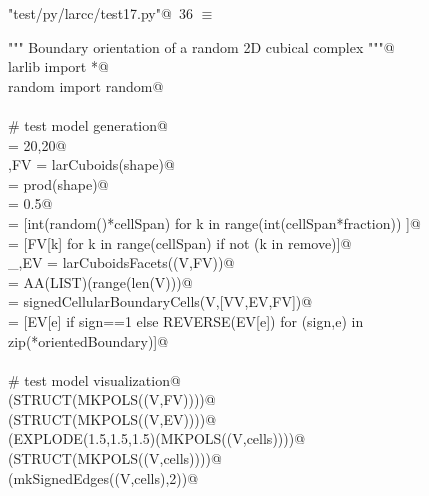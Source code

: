 \documentclass[11pt,oneside]{article}    %
\begin{document}
\begin{flushleft} \small \label{scrap58}
\protect{}\verb@"test/py/larcc/test17.py"@\nobreak\ {\footnotesize 36 }$\equiv$
\vspace{-1ex}
\begin{list}{}{} \item
\mbox{}\verb@""" Boundary orientation of a random 2D cubical complex """@\\
\mbox{}\verb@from larlib import *@\\
\mbox{}\verb@from random import random@\\
\mbox{}\verb@@\\
\mbox{}\verb@# test model generation@\\
\mbox{}\verb@shape = 20,20@\\
\mbox{}\verb@V,FV = larCuboids(shape)@\\
\mbox{}\verb@cellSpan = prod(shape)@\\
\mbox{}\verb@fraction = 0.5@\\
\mbox{}\verb@remove = [int(random()*cellSpan) for k in range(int(cellSpan*fraction)) ]@\\
\mbox{}\verb@FV = [FV[k] for k in range(cellSpan) if not (k in remove)]@\\
\mbox{}\verb@_,EV = larCuboidsFacets((V,FV))@\\
\mbox{}\verb@VV = AA(LIST)(range(len(V)))@\\
\mbox{}\verb@orientedBoundary = signedCellularBoundaryCells(V,[VV,EV,FV])@\\
\mbox{}\verb@cells = [EV[e] if sign==1 else REVERSE(EV[e]) for (sign,e) in zip(*orientedBoundary)]@\\
\mbox{}\verb@@\\
\mbox{}\verb@# test model visualization@\\
\mbox{}\verb@VIEW(STRUCT(MKPOLS((V,FV))))@\\
\mbox{}\verb@VIEW(STRUCT(MKPOLS((V,EV))))@\\
\mbox{}\verb@VIEW(EXPLODE(1.5,1.5,1.5)(MKPOLS((V,cells))))@\\
\mbox{}\verb@VIEW(STRUCT(MKPOLS((V,cells))))@\\
\mbox{}\verb@VIEW(mkSignedEdges((V,cells),2))@\\
\mbox{}\verb@@{\NWsep}
\end{list}
\vspace{-2ex}
\end{flushleft}
\end{document}
